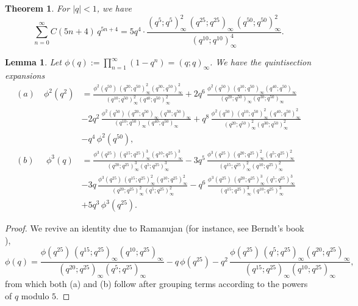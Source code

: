 \documentclass{article}
\newtheorem{theorem}{Theorem}
\newtheorem{lemma}{Lemma}
\begin{document}
\medskip
\begin{theorem} \label{Th:1}
    For $|q|<1$, we have
        $$
    \sum_{n=0}^\infty C(5n+4) \, q^{5n+4} 
    =5q^4\cdot \frac{(q^5;q^5)^2_\infty\,(q^{25};q^{25})_\infty\,(q^{50};q^{50})^2_\infty}{(q^{10};q^{10})^4_\infty}.
    $$
\end{theorem}

\begin{lemma} \label{Lm:1} Let $\phi(q):= \prod_{n = 1}^{\infty}(1 - q^{n}) = (q; q)_{\infty}$. We have the quintisection expansions 
\begin{align*} (a) \quad \phi^2(q^2)
&=\frac{\phi^2(q^{50})\, (q^{20};q^{50})_{\infty}^2(q^{30};q^{50})_{\infty}^2}{(q^{10};q^{50})_{\infty}^2(q^{40};q^{50})_{\infty}^2}
+2q^6\, \frac{\phi^2(q^{50})\, (q^{10};q^{50})_{\infty}(q^{40};q^{50})_{\infty}}{(q^{20};q^{50})_{\infty} (q^{30};q^{50})_{\infty}}  \\
&- 2q^2\, \frac{\phi^2(q^{50})\, (q^{20};q^{50})_{\infty}(q^{30};q^{50})_{\infty}}{(q^{10};q^{50})_{\infty} (q^{40};q^{50})_{\infty}} 
+q^8\, \frac{\phi^2(q^{50})\, (q^{10};q^{50})_{\infty}^2(q^{40};q^{50})_{\infty}^2 }{(q^{20};q^{50})_{\infty}^2(q^{30};q^{50})_{\infty}^2} \\
& -q^4\, \phi^2(q^{50}), \\
(b) \ \, \quad \phi^3(q)
&=\frac{\phi^3(q^{25})\, (q^{15};q^{25})_{\infty}^3 (q^{10};q^{25})_{\infty}^3} {(q^{20};q^{25})_{\infty}^3(q^{5};q^{25})_{\infty}^3} 
-3q^5\, \frac{\phi^3(q^{25})\, (q^{20};q^{25})_{\infty}^2 (q^{5};q^{25})_{\infty}^2} {(q^{15};q^{25})_{\infty}^2 (q^{10};q^{25})_{\infty}^2} \\
& - 3q\, \frac{\phi^3(q^{25})\, (q^{15};q^{25})_{\infty}^2 (q^{10};q^{25})_{\infty}^2} { (q^{20};q^{25})_{\infty}^2 (q^{5};q^{25})_{\infty}^2} 
- q^6\, \frac{\phi^3(q^{25})\, (q^{20};q^{25})_{\infty}^3(q^{5};q^{25})_{\infty}^3} {(q^{15};q^{25})_{\infty}^3 (q^{10};q^{25})_{\infty}^3} \\
& +5q^3\, \phi^3(q^{25}).
\end{align*}
\end{lemma}

\begin{proof} We revive an identity due to Ramanujan (for instance, see Berndt's book \cite[pp. 81-82]{Berndt91}),
$$\phi(q)=\frac{\phi(q^{25})\, (q^{15};q^{25})_{\infty} (q^{10};q^{25})_{\infty}}{(q^{20};q^{25})_{\infty}(q^{5};q^{25})_{\infty}} -q\,  \phi(q^{25})
-q^2\, \frac{\phi(q^{25})\, (q^{5};q^{25})_{\infty} (q^{20};q^{25})_{\infty}}
{(q^{15};q^{25})_{\infty}(q^{10};q^{25})_{\infty}},$$
from which both (a) and (b) follow after grouping terms according to the powers of $q$ modulo $5$.
\end{proof}
\end{document}
